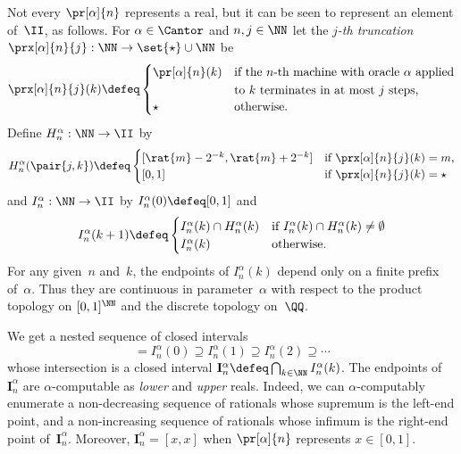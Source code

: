 Not every $\pr[\alpha]{n}$ represents a real, but it can be seen to represent an element of~$\II$, as follows.
%
For $\alpha \in \Cantor$ and $n, j \in \NN$ let the \emph{$j$-th truncation} $\prx[\alpha]{n}{j} : \NN \to \set{\star} \cup \NN$ be
%
\begin{equation*}
  \prx[\alpha]{n}{j}(k) \defeq
  \begin{cases}
    \pr[\alpha]{n}(k) &
      \begin{aligned}[t]
        &\text{if the $n$-th machine with oracle~$\alpha$ applied} \\
        &\text{to~$k$ terminates in at most $j$ steps,}
      \end{aligned}
    \\
    \star &
    \text{otherwise.}
  \end{cases}
\end{equation*}
%
Define $H^\alpha_n : \NN \to \II$ by
%
\begin{equation*}
  H^\alpha_n(\pair{j, k}) \defeq
  \begin{cases}
    [\rat{m} - 2^{-k}, \rat{m} + 2^{-k}] &
      \text{if $\prx[\alpha]{n}{j}(k) = m$,} \\
    [0,1] & \text{if $\prx[\alpha]{n}{j}(k) = \star$}
  \end{cases}
\end{equation*}
% 
and $I^\alpha_n : \NN \to \II$ by $I^\alpha_n(0) \defeq [0,1]$ and
%
\begin{equation*}
  I^\alpha_n(k+1) \defeq
  \begin{cases}
    I^\alpha_n(k) \cap H^\alpha_n(k) &
      \text{if $I^\alpha_n(k) \cap H^\alpha_n(k) \neq \emptyset$}
    \\
    I^\alpha_n(k) & \text{otherwise.}
  \end{cases}
\end{equation*}
%
For any given~$n$ and~$k$, the endpoints of $I^\alpha_n(k)$ depend only on a finite prefix of~$\alpha$. Thus they are continuous in parameter~$\alpha$ with respect to the product topology on $[0,1]^\NN$ and the discrete topology on~$\QQ$.

We get a nested sequence of closed intervals
%
\begin{equation*}
  [0,1] = I^\alpha_n(0) \supseteq I^\alpha_n(1) \supseteq I^\alpha_n(2) \supseteq \cdots
\end{equation*}
%
whose intersection is a closed interval $\mathbf{I}^\alpha_n \defeq \bigcap_{k \in \NN} I^\alpha_n(k)$.
The endpoints of $\mathbf{I}^\alpha_n$ are $\alpha$-computable as \emph{lower} and \emph{upper} reals. Indeed, we can $\alpha$-computably enumerate a non-decreasing sequence of rationals whose supremum is the left-end point, and a non-increasing sequence of rationals whose infimum is the right-end point of~$\mathbf{I}^\alpha_n$.
%
Moreover, $\mathbf{I}^\alpha_n = [x,x]$ when $\pr[\alpha]{n}$ represents $x \in [0,1]$.

